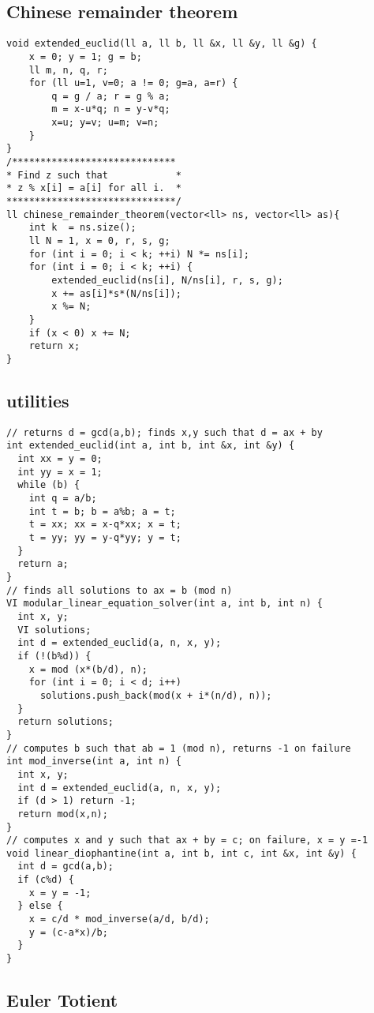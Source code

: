 \documentclass[10pt,letterpaper,twocolumn,twosided]{article}
\begin{document}
\subsection{Chinese remainder theorem}

\begin{lstlisting}
void extended_euclid(ll a, ll b, ll &x, ll &y, ll &g) {
    x = 0; y = 1; g = b;
    ll m, n, q, r;
    for (ll u=1, v=0; a != 0; g=a, a=r) {
        q = g / a; r = g % a;
        m = x-u*q; n = y-v*q;
        x=u; y=v; u=m; v=n;
    }
}
/*****************************
* Find z such that            *
* z % x[i] = a[i] for all i.  *
******************************/
ll chinese_remainder_theorem(vector<ll> ns, vector<ll> as){
    int k  = ns.size();
    ll N = 1, x = 0, r, s, g;
    for (int i = 0; i < k; ++i) N *= ns[i];
    for (int i = 0; i < k; ++i) {
        extended_euclid(ns[i], N/ns[i], r, s, g);
        x += as[i]*s*(N/ns[i]);
        x %= N;
    }
    if (x < 0) x += N;
    return x;
}
\end{lstlisting}

\subsection{utilities}

\begin{lstlisting}
// returns d = gcd(a,b); finds x,y such that d = ax + by
int extended_euclid(int a, int b, int &x, int &y) {  
  int xx = y = 0;
  int yy = x = 1;
  while (b) {
    int q = a/b;
    int t = b; b = a%b; a = t;
    t = xx; xx = x-q*xx; x = t;
    t = yy; yy = y-q*yy; y = t;
  }
  return a;
}
// finds all solutions to ax = b (mod n)
VI modular_linear_equation_solver(int a, int b, int n) {
  int x, y;
  VI solutions;
  int d = extended_euclid(a, n, x, y);
  if (!(b%d)) {
    x = mod (x*(b/d), n);
    for (int i = 0; i < d; i++)
      solutions.push_back(mod(x + i*(n/d), n));
  }
  return solutions;
}
// computes b such that ab = 1 (mod n), returns -1 on failure
int mod_inverse(int a, int n) {
  int x, y;
  int d = extended_euclid(a, n, x, y);
  if (d > 1) return -1;
  return mod(x,n);
}
// computes x and y such that ax + by = c; on failure, x = y =-1
void linear_diophantine(int a, int b, int c, int &x, int &y) {
  int d = gcd(a,b);
  if (c%d) {
    x = y = -1;
  } else {
    x = c/d * mod_inverse(a/d, b/d);
    y = (c-a*x)/b;
  }
}
\end{lstlisting}

\subsection{Euler Totient} 
\end{document}
